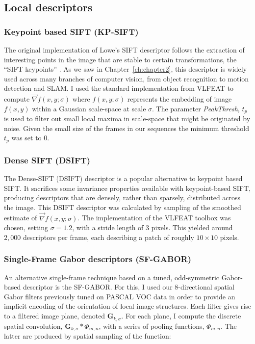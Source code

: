 \subsection{Local descriptors}
\label{sec:descriptors}

\subsubsection{Keypoint based SIFT (KP-SIFT)}

The original implementation of Lowe's SIFT descriptor follows the extraction of interesting points in the image that are stable to certain transformations, the ``SIFT keypoints'' \cite{Lowe2004}. As we saw in Chapter~\ref{ch:chapter2}, this descriptor is widely used across many branches of computer vision, from object recognition to motion detection and SLAM. I used the standard implementation from VLFEAT \cite{Vedaldi2008} to compute $\vec{\nabla}f(x,y;\sigma)$ where $f(x,y;\sigma)$ represents the embedding of image $f(x,y)$ within a Gaussian scale-space at scale $\sigma$. The parameter \emph{PeakThresh}, $t_p$ is used to filter out small local maxima in scale-space that might be originated by noise. Given the small size of the frames in our sequences the minimum threshold $t_p$ was set to $0$.

\subsubsection{Dense SIFT (DSIFT)}

The Dense-SIFT (DSIFT) descriptor \citep{Lazebnik2006} is a popular  alternative to keypoint based SIFT. It sacrifices some invariance properties available with keypoint-based SIFT, producing descriptors that are densely, rather than sparsely, distributed across the image. This DSIFT descriptor was calculated by  sampling of the smoothed estimate of $\vec{\nabla}f(x,y;\sigma)$.  The implementation of the VLFEAT toolbox was chosen, setting $\sigma = 1.2$, with a stride length of 3 pixels. This  yielded around $2,000$ descriptors per frame, each describing a patch of roughly $10 \times 10$ pixels.

\subsubsection{Single-Frame Gabor descriptors (SF-GABOR)}
\label{sec:sf-gabor}

An alternative single-frame technique based on a tuned, odd-symmetric Gabor-based descriptor is the SF-GABOR. For this, I used our $8$-directional spatial Gabor filters previously tuned on PASCAL VOC data \cite{Everingham2009} in order to provide an implicit encoding of the orientation of local image structures.  Each filter gives rise to a filtered image plane, denoted $\mathbf{G}_{k,\sigma}$.  For each plane, I compute the discrete spatial convolution, $\mathbf{G}_{k,\sigma} \ast {\Phi}_{m,n}$, with a series of pooling functions, ${\Phi}_{m,n}$. The latter are produced by spatial sampling of the function:

